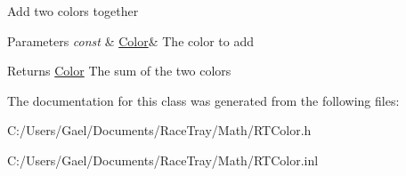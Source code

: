 Add two colors together 
\begin{DoxyParams}{Parameters}
{\em const} & \hyperlink{class_race_tray_1_1_color}{Color}\& The color to add \\
\hline
\end{DoxyParams}
\begin{DoxyReturn}{Returns}
\hyperlink{class_race_tray_1_1_color}{Color} The sum of the two colors 
\end{DoxyReturn}


The documentation for this class was generated from the following files\-:\begin{DoxyCompactItemize}
\item 
C\-:/\-Users/\-Gael/\-Documents/\-Race\-Tray/\-Math/R\-T\-Color.\-h\item 
C\-:/\-Users/\-Gael/\-Documents/\-Race\-Tray/\-Math/R\-T\-Color.\-inl\end{DoxyCompactItemize}
